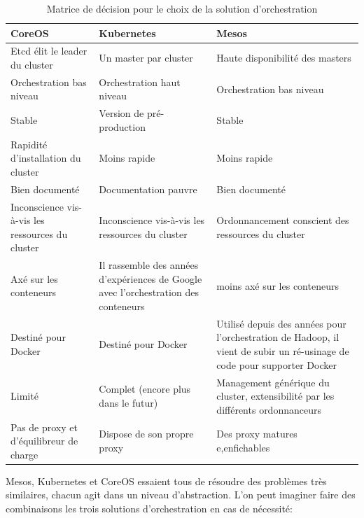 {
\begin{center}
\begin{table}[H]

	\begin{tabu}{| X[c] | X[c] | X[c] |} 


	\hline
	\textbf{CoreOS} & \textbf{Kubernetes} & \textbf{Mesos}\\ [0.95ex] 
	\hline\hline
	Etcd élit le leader du cluster 	& Un master par cluster & Haute disponibilité des masters \\ 
	Orchestration bas niveau & Orchestration haut niveau & Orchestration bas niveau \\ 
	Stable					& Version de pré-production & Stable \\ 
	Rapidité d’installation du cluster & Moins rapide & Moins rapide \\ 
	Bien documenté & Documentation pauvre & Bien documenté \\ 
	Inconscience vis-à-vis les ressources du cluster & Inconscience vis-à-vis les ressources du cluster & Ordonnancement conscient des ressources du cluster \\ 
	Axé sur les conteneurs & Il rassemble des années d’expériences de Google avec l'orchestration des conteneurs	& moins axé sur les conteneurs \\ 
	Destiné pour Docker & Destiné pour Docker	& Utilisé depuis des années pour l'orchestration de Hadoop, il vient de subir un ré-usinage de code pour supporter Docker \\ 
	Limité & Complet (encore plus dans le futur) & Management générique du cluster, extensibilité par les différents ordonnanceurs \\ 
	Pas de proxy et d'équilibreur de charge & Dispose de son propre proxy & Des proxy matures e,enfichables \\ 
	\hline
	\end{tabu}
	\caption{Matrice de décision pour le choix de la solution d'orchestration}
	\label{tab:table_label}

\end{table}
\end{center}
}


Mesos, Kubernetes et CoreOS essaient tous de résoudre des problèmes très similaires, chacun agit dans un niveau d'abstraction. L'on peut imaginer faire des combinaisons les trois solutions d'orchestration en cas de nécessité:

